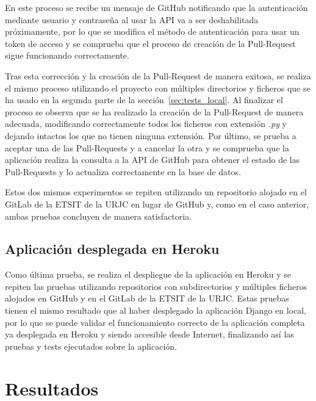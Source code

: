 \documentclass[a4paper, 12pt]{book}
\begin{document}
En este proceso se recibe un mensaje de GitHub notificando que la autenticación mediante usuario y contraseña al usar la API va a ser deshabilitada próximamente, por lo que se modifica el método de autenticación para usar un token de acceso y se comprueba que el proceso de creación de la Pull-Request sigue funcionando correctamente.

Tras esta corrección y la creación de la Pull-Request de manera exitosa, se realiza el mismo proceso utilizando el proyecto con múltiples directorios y ficheros que se ha usado en la segunda parte de la sección~\ref{sec:tests_local}.
Al finalizar el proceso se observa que se ha realizado la creación de la Pull-Request de manera adecuada, modificando correctamente todos los ficheros con extensión \textit{.py} y dejando intactos los que no tienen ninguna extensión.
Por último, se prueba a aceptar una de las Pull-Requests y a cancelar la otra y se comprueba que la aplicación realiza la consulta a la API de GitHub para obtener el estado de las Pull-Requests y lo actualiza correctamente en la base de datos.

Estos dos mismos experimentos se repiten utilizando un repositorio alojado en el GitLab de la ETSIT de la URJC en lugar de GitHub y, como en el caso anterior, ambas pruebas concluyen de manera satisfactoria.

\section{Aplicación desplegada en Heroku}
\label{sec:tests_heroku}

Como última prueba, se realiza el despliegue de la aplicación en Heroku y se repiten las pruebas utilizando repositorios con subdirectorios y múltiples ficheros alojados en GitHub y en el GitLab de la ETSIT de la URJC.
Estas pruebas tienen el mismo resultado que al haber desplegado la aplicación Django en local, por lo que se puede validar el funcionamiento correcto de la aplicación completa ya desplegada en Heroku y siendo accesible desde Internet, finalizando así las pruebas y tests ejecutados sobre la aplicación.


\cleardoublepage
\chapter{Resultados}
\label{chap:resultados}
\end{document}
